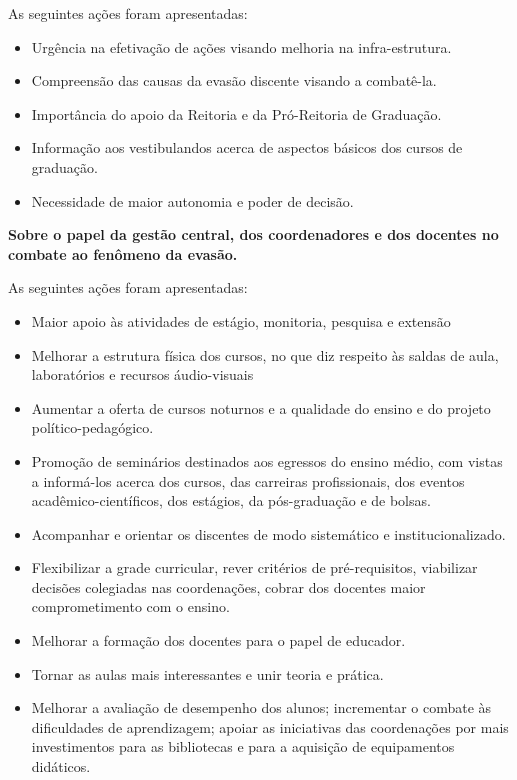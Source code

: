 \documentclass{report}
\begin{document}
As seguintes ações foram apresentadas:

\begin{itemize}
\item Urgência na efetivação de ações visando melhoria na infra-estrutura.
\item Compreensão das causas da evasão discente visando a combatê-la.
\item Importância do apoio da Reitoria e da Pró-Reitoria de Graduação.
\item Informação aos vestibulandos acerca de aspectos básicos dos cursos de graduação.
\item Necessidade de maior autonomia e poder de decisão.
\end{itemize}

\textbf{Sobre o papel da gestão central, dos coordenadores e dos docentes no combate ao fenômeno da evasão.}

As seguintes ações foram apresentadas:

\begin{itemize}
\item Maior apoio às atividades de estágio, monitoria, pesquisa e extensão
\item Melhorar a estrutura física dos cursos, no que diz respeito às saldas de aula, laboratórios e recursos áudio-visuais
\item Aumentar a oferta de cursos noturnos e a qualidade do ensino e do projeto político-pedagógico.
\item Promoção de seminários destinados aos egressos do ensino médio, com vistas a informá-los acerca dos cursos, das carreiras profissionais, dos eventos acadêmico-científicos, dos estágios, da pós-graduação e de bolsas.
\item Acompanhar e orientar os discentes de modo sistemático e institucionalizado.
\item Flexibilizar a grade curricular, rever critérios de pré-requisitos, viabilizar decisões colegiadas nas coordenações, cobrar dos docentes maior comprometimento com o ensino.
\item Melhorar a formação dos docentes para o papel de educador.
\item Tornar as aulas mais interessantes e unir teoria e prática.
\item Melhorar a avaliação de desempenho dos alunos; incrementar o combate às dificuldades de aprendizagem; apoiar as iniciativas das coordenações por mais investimentos para as bibliotecas e para a aquisição de equipamentos didáticos.
\end{itemize}
\end{document}
